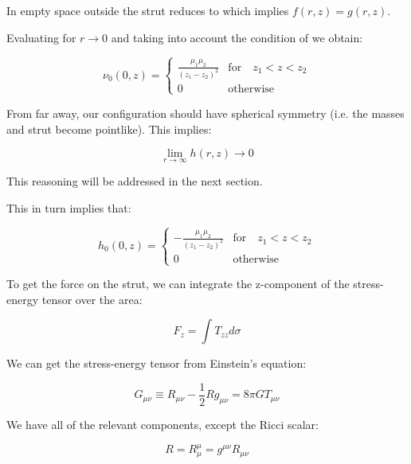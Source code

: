\documentclass{article}
\begin{document}
In empty space outside the strut  reduces to  which implies $f(r,z)=g(r,z)$.

Evaluating  for $r\rightarrow 0$ and taking into account the condition of  we obtain:

\begin{equation}
\label{eq:nu_r=0}
\nu_0 (0,z) = \left\{  \begin{array}{cl}\frac{\mu_{1}\mu_{2}}{\left(z_{1}-z_{2}\right)^{2}} & \mbox{for}\quad  z_{1}<z<z_{2} \\ 0 & \mbox{otherwise}\end{array}\right. 
\end{equation}

From far away, our configuration should have spherical symmetry (i.e. the masses and strut become pointlike). This implies:

\begin{equation}
	\label{eq:h-limit}
	\lim_{r\rightarrow \infty} h(r,z)\rightarrow 0
\end{equation}

This reasoning will be addressed in the next section.

This in turn implies that:

\begin{equation}
\label{eq:h_r=0}
h_0 (0,z) = \left\{  \begin{array}{cl}-\frac{\mu_{1}\mu_{2}}{\left(z_{1}-z_{2}\right)^{2}} & \mbox{for}\quad  z_{1}<z<z_{2} \\ 0 & \mbox{otherwise}\end{array}\right. 
\end{equation}

To get the force on the strut, we can integrate the z-component of the stress-energy tensor over the area:

\begin{equation}
F_{z}=\int T_{zz}d\sigma
\end{equation}

We can get the stress-energy tensor from Einstein's equation:

\begin{equation}
G_{\mu\nu}\equiv R_{\mu\nu}-\frac{1}{2}Rg_{\mu\nu}=8\pi GT_{\mu\nu}\label{eq:einstein}
\end{equation}

We have all of the relevant components, except the Ricci scalar:

\begin{equation}
R=R_{\mu}^{\mu}=g^{\mu\nu}R_{\mu\nu}
\end{equation}
\end{document}
